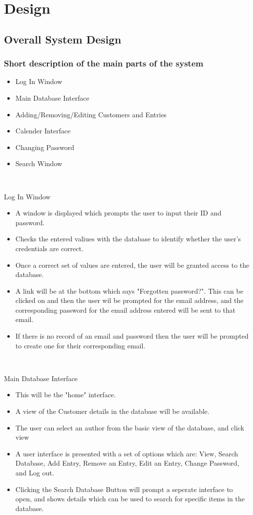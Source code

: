 \chapter{Design}

\section{Overall System Design}

\subsection{Short description of the main parts of the system}

\begin{itemize}
\item Log In Window
\item Main Database Interface
\item Adding/Removing/Editing Customers and Entries
\item Calender Interface
\item Changing Password
\item Search Window
\end{itemize}

\

Log In Window
\begin{itemize}
    \item A window is displayed which prompts the user to input their ID and password.
    \item Checks the entered valiues with the database to identify whether the user's credentials are correct.
    \item Once a correct set of values are entered, the user will be granted access to the database.
    \item A link will be at the bottom which says "Forgotten password?". This can be clicked on and then the user wil be prompted for the email address, and the corresponding password for the email address entered will be sent to that email.
    \item If there is no record of an email and password then the user will be prompted to create one for their corresponding email.
\end{itemize}

\
  
Main Database Interface
\begin{itemize}
    \item This will be the "home" interface.
    \item A view of the Customer details in the database will be available.
    \item The user can select an author from the basic view of the database, and click view
    \item A user interface is presented with a set of options which are: View, Search Database, Add Entry, Remove an Entry, Edit an Entry, Change Password, and Log out.
    \item Clicking the Search Database Button will prompt a seperate interface to open, and shows details which can be used to search for specific items in the database.

\end{itemize}

